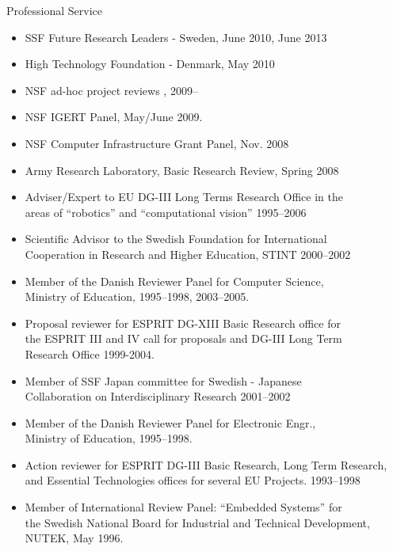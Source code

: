 \documentclass{article}
\begin{document}
\begin{cv}
\begin{cvlist}{Professional Service}
\begin{itemize}
 \item SSF Future Research Leaders - Sweden, \cftdotfill{\cftdotsep} June 2010, June 2013
 \item High Technology Foundation - Denmark, \cftdotfill{\cftdotsep}  May 2010
 \item NSF ad-hoc project reviews \cftdotfill{\cftdotsep}, 2009--
 \item NSF IGERT Panel, \cftdotfill{\cftdotsep} May/June 2009.
 \item NSF Computer Infrastructure Grant Panel,  \cftdotfill{\cftdotsep} Nov. 2008
 \item Army Research Laboratory, Basic Research Review, \cftdotfill{\cftdotsep}  Spring 2008
 \item Adviser/Expert to EU DG-III Long Terms Research Office in the\\
   areas of ``robotics'' and ``computational vision''
   \cftdotfill{\cftdotsep}  1995--2006
 \item Scientific Advisor to the Swedish Foundation for International\\
   Cooperation in Research and Higher Education,  STINT
   \cftdotfill{\cftdotsep}  2000--2002
 \item Member of the Danish Reviewer Panel for Computer Science,\\
   Ministry of Education, \cftdotfill{\cftdotsep}  1995--1998, 2003--2005.
 \item Proposal reviewer for ESPRIT DG-XIII Basic Research office for\\
   the ESPRIT III and IV call for proposals and DG-III Long Term\\
   Research Office \cftdotfill{\cftdotsep}  1999-2004.
 \item Member of SSF Japan committee for Swedish - Japanese\\
   Collaboration on Interdisciplinary Research \cftdotfill{\cftdotsep}
   2001--2002
 \item Member of the Danish Reviewer Panel for Electronic Engr.,\\
   Ministry of Education, \cftdotfill{\cftdotsep}  1995--1998.
 \item Action reviewer for ESPRIT DG-III Basic Research, Long Term
   Research,\\ and Essential Technologies offices for several EU
   Projects. \cftdotfill{\cftdotsep} 1993--1998
 \item Member of International Review Panel: ``Embedded Systems'' for\\
   the Swedish National Board for Industrial and Technical Development,\\
   NUTEK, \cftdotfill{\cftdotsep} May 1996.
 \end{itemize}
\end{cvlist}


\end{cv}
\end{document}
